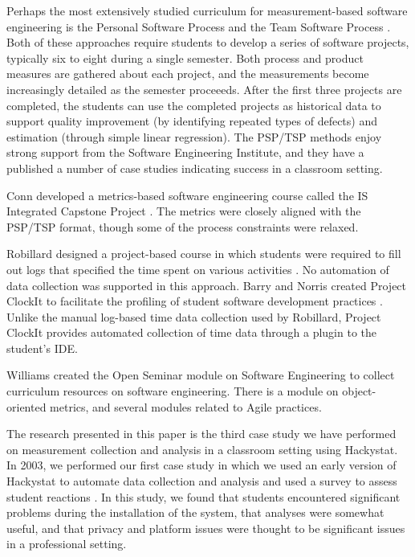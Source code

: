 \documentclass{acm_proc_article-sp}
\begin{document}
Perhaps the most extensively studied curriculum for measure\-ment-based
software engineering is the Personal Software Process \cite{Humphrey95} and
the Team Software Process \cite{Humphrey00}.  Both of these approaches
require students to develop a series of software projects, typically six to
eight during a single semester.  Both process and product measures are
gathered about each project, and the measurements become increasingly
detailed as the semester proceeeds. After the first three projects are
completed, the students can use the completed projects as historical data
to support quality improvement (by identifying repeated types of defects)
and estimation (through simple linear regression).  The PSP/TSP methods
enjoy strong support from the Software Engineering Institute, and they have
a published a number of case studies indicating success in a classroom setting. 

Conn developed a metrics-based software engineering course called the 
IS Integrated Capstone Project \cite{Conn04}.  The metrics were closely aligned
with the PSP/TSP format, though some of the process constraints were relaxed. 

Robillard designed a project-based course in which students were required
to fill out logs that specified the time spent on various activities
\cite{Robillard98}.  No automation of data collection was supported in this
approach.  Barry and Norris created Project ClockIt to facilitate the
profiling of student software development practices \cite{Barry05}.  Unlike
the manual log-based time data collection used by Robillard, Project
ClockIt provides automated collection of time data through a plugin to the
student's IDE.

Williams created the Open Seminar module on Software Engineering to collect
curriculum resources on software engineering.  There is a module on
object-oriented metrics, and several modules related to Agile practices.  

The research presented in this paper is the third case study we have
performed on measurement collection and analysis in a classroom setting
using Hackystat.  In 2003, we performed our first case study in which we used an
early version of Hackystat to automate data collection and analysis and
used a survey to assess student reactions \cite{csdl2-03-12}.  In this
study, we found that students encountered significant problems during the
installation of the system, that analyses were somewhat useful, and that
privacy and platform issues were thought to be significant issues in a
professional setting.
\end{document}

